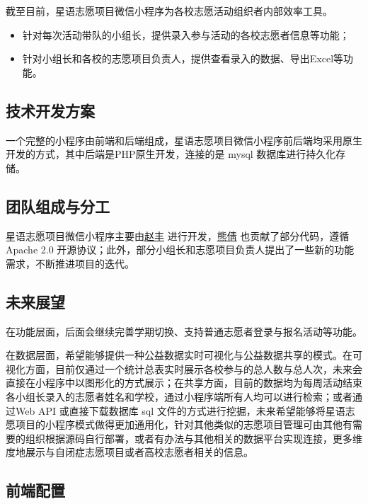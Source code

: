 \documentclass[]{ctexart}
\begin{document}
截至目前，星语志愿项目微信小程序为各校志愿活动组织者内部效率工具。

\begin{itemize}
\item
  针对每次活动带队的小组长，提供录入参与活动的各校志愿者信息等功能；
\item
  针对小组长和各校的志愿项目负责人，提供查看录入的数据、导出Excel等功能。
\end{itemize}

\subsection{技术开发方案}\label{ux6280ux672fux5f00ux53d1ux65b9ux6848}

一个完整的小程序由前端和后端组成，星语志愿项目微信小程序前后端均采用原生开发的方式，其中后端是PHP原生开发，连接的是
mysql 数据库进行持久化存储。

\subsection{团队组成与分工}\label{ux56e2ux961fux7ec4ux6210ux4e0eux5206ux5de5}

星语志愿项目微信小程序主要由\href{https://github.com/zhaofeng-shu33}{赵丰}
进行开发，\href{https://github.com/Prisicilla}{熊倩}
也贡献了部分代码，遵循 Apache 2.0 开源协议；此外，部分小组长和志愿项目负责人提出了一些新的功能需求，不断推进项目的迭代。

\subsection{未来展望}
在功能层面，后面会继续完善学期切换、支持普通志愿者登录与报名活动等功能。

在数据层面，希望能够提供一种公益数据实时可视化与公益数据共享的模式。在可视化方面，目前仅通过一个统计总表实时展示各校参与的总人数与总人次，未来会直接在小程序中以图形化的方式展示；在共享方面，目前的数据均为每周活动结束各小组长录入的志愿者姓名和学校，通过小程序端所有人均可以进行检索；或者通过Web API 或直接下载数据库 sql 文件的方式进行挖掘，未来希望能够将星语志愿项目的小程序模式做得更加通用化，针对其他类似的志愿项目管理可由其他有需要的组织根据源码自行部署，或者有办法与其他相关的数据平台实现连接，更多维度地展示与自闭症志愿项目或者高校志愿者相关的信息。

\subsection{前端配置}\label{ux524dux7aefux914dux7f6e}
\end{document}
